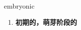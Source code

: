 
\begin{frame}
{\huge embryonic}
\begin{center}
\begin{enumerate}\Large
  \item \textbf{初期的，萌芽阶段的}
\end{enumerate}
\end{center}
\end{frame}
